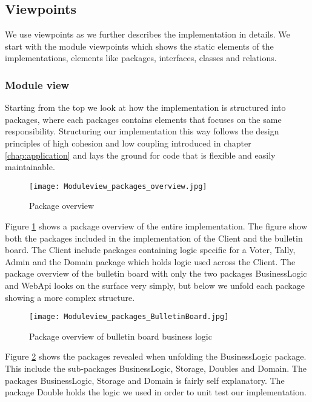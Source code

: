 \subsection{Viewpoints}
We use viewpoints as we further describes the implementation in details. We start with the module viewpoints which shows the static elements of the implementations, elements like packages, interfaces, classes and relations.

\subsubsection{Module view}
Starting from the top we look at how the implementation is structured into packages, where each packages contains elements that focuses on the same responsibility. Structuring our implementation this way follows the design principles of high cohesion and low coupling introduced in chapter \ref{chap:application} and lays the ground for code that is flexible and easily maintainable. 

\begin{figure}[H]
    \centering
    \texttt{[image: Moduleview\_packages\_overview.jpg]}
    \caption{Package overview}
    \label{fig:package_overview}
\end{figure}

\noindent
Figure \ref{fig:package_overview} shows a package overview of the entire implementation. The figure show both the packages included in the implementation of the Client and the bulletin board. The Client include packages containing logic specific for a Voter, Tally, Admin and the Domain package which holds logic used across the Client. The package overview of the bulletin board with only the two packages BusinessLogic and WebApi looks on the surface very simply, but below we unfold each package showing a more complex structure. 

\begin{figure}[H]
    \centering
    \texttt{[image: Moduleview\_packages\_BulletinBoard.jpg]}
    \caption{Package overview of bulletin board business logic}
    \label{fig:package_overview_of_bulletinboard_businesslogic}
\end{figure}

\noindent
Figure \ref{fig:package_overview_of_bulletinboard_businesslogic} shows the packages revealed when unfolding the BusinessLogic package. This include the sub-packages BusinessLogic, Storage, Doubles and Domain. The packages BusinessLogic, Storage and Domain is fairly self explanatory. The package Double holds the logic we used in order to unit test our implementation. \\


